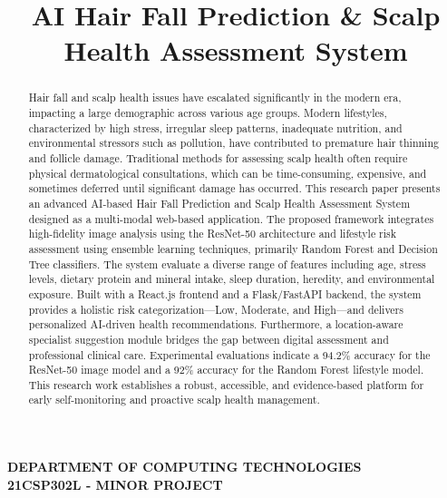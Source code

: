 \documentclass[conference]{IEEEtran}
\begin{document}
\begin{center}
    {\large \textbf{DEPARTMENT OF COMPUTING TECHNOLOGIES}} \\
    {\normalsize \textbf{21CSP302L - MINOR PROJECT}}
\end{center}

\title{\huge AI Hair Fall Prediction \& Scalp Health Assessment System}

\author{
\and
{}
\and
{}
\and
{}
}

\maketitle

\begin{abstract}
Hair fall and scalp health issues have escalated significantly in the modern era, impacting a large demographic across various age groups. Modern lifestyles, characterized by high stress, irregular sleep patterns, inadequate nutrition, and environmental stressors such as pollution, have contributed to premature hair thinning and follicle damage. Traditional methods for assessing scalp health often require physical dermatological consultations, which can be time-consuming, expensive, and sometimes deferred until significant damage has occurred. This research paper presents an advanced AI-based Hair Fall Prediction and Scalp Health Assessment System designed as a multi-modal web-based application. The proposed framework integrates high-fidelity image analysis using the ResNet-50 architecture and lifestyle risk assessment using ensemble learning techniques, primarily Random Forest and Decision Tree classifiers. The system evaluate a diverse range of features including age, stress levels, dietary protein and mineral intake, sleep duration, heredity, and environmental exposure. Built with a React.js frontend and a Flask/FastAPI backend, the system provides a holistic risk categorization—Low, Moderate, and High—and delivers personalized AI-driven health recommendations. Furthermore, a location-aware specialist suggestion module bridges the gap between digital assessment and professional clinical care. Experimental evaluations indicate a 94.2\% accuracy for the ResNet-50 image model and a 92\% accuracy for the Random Forest lifestyle model. This research work establishes a robust, accessible, and evidence-based platform for early self-monitoring and proactive scalp health management.
\end{abstract}
\end{document}
